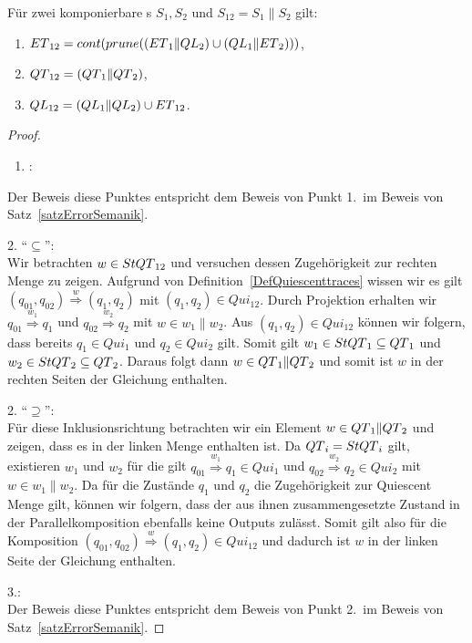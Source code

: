\begin{satz}
  \label{satzQuiSemantik}
  Für zwei komponierbare \EIO{}s $S_1, S_2$ und $S_{12} = S_1\|S_2$ gilt:
  \begin{enumerate}
    \item $ET{}_{12} = cont{}(prune{}((ET{}_1\|QL{}_2)\cup (QL{}_1\|ET{}_2)))$,
    \item $QT{}_{12} = (QT{}_1\|QT{}_2)$,%
    \item $QL{}_{12} = (QL{}_1\|QL{}_2)\cup ET{}_{12}$.%
  \end{enumerate}
\end{satz}

\begin{proof}
  ~
  \begin{enumerate}
    \item \hspace{-0.2cm}:
  \end{enumerate}
  \vspace{-0.3cm}
  Der Beweis diese Punktes entspricht dem Beweis von Punkt 1.\ im Beweis von
  Satz~\ref{satzErrorSemanik}.

  2. ``$\subseteq$'':\\
  Wir betrachten $w\in StQT{}_{12}$ und versuchen dessen
  Zugehörigkeit zur rechten Menge zu zeigen. Aufgrund von
  Definition~\ref{DefQuiescenttraces} wissen wir es gilt $(q_{01},q_{02})
  \overset{w}{\Rightarrow} (q_1,q_2)$ mit $(q_1,q_2)\in Qui_{12}$. Durch
  Projektion erhalten wir $q_{01} \overset{w_1}{\Rightarrow} q_1$ und $q_{02}
  \overset{w_2}{\Rightarrow} q_2$ mit $w\in w_1\|w_2$. Aus $(q_1,q_2)\in
  Qui_{12}$ können wir folgern, dass bereits $q_1\in Qui_1$ und $q_2\in
  Qui_2$ gilt. Somit gilt $w_1\in StQT{}_1\subseteq QT{}_1$ und $w_2\in
  StQT{}_2\subseteq QT{}_2$. Daraus folgt dann $w\in QT{}_1\|QT{}_2$ und somit ist $w$
  in der rechten Seiten der Gleichung enthalten.

  2. ``$\supseteq$'':\\
  Für diese Inklusionsrichtung betrachten wir ein Element $w\in QT{}_1\|QT{}_2$ und
  zeigen, dass es in der linken Menge enthalten ist. Da $QT{}_i = StQT{}_i$ gilt,
  existieren $w_1$ und $w_2$ für die gilt $q_{01} \overset{w_1}{\Rightarrow}
  q_1\in Qui_1$ und $q_{02} \overset{w_2}{\Rightarrow} q_2\in Qui_2$ mit $w\in
  w_1\| w_2$. Da für die Zustände $q_1$ und $q_2$ die Zugehörigkeit zur
  Quiescent Menge gilt, können wir folgern, dass der aus ihnen zusammengesetzte
  Zustand in der Parallelkomposition ebenfalls keine Outputs zulässt. Somit
  gilt also für die Komposition $(q_{01},q_{02}) \overset{w}{\Rightarrow}
  (q_1,q_2)\in Qui_{12}$ und dadurch ist $w$ in der linken Seite der Gleichung
  enthalten.

  3.:\\
  Der Beweis diese Punktes entspricht dem Beweis von Punkt 2.\ im Beweis von
  Satz~\ref{satzErrorSemanik}.
\end{proof}

